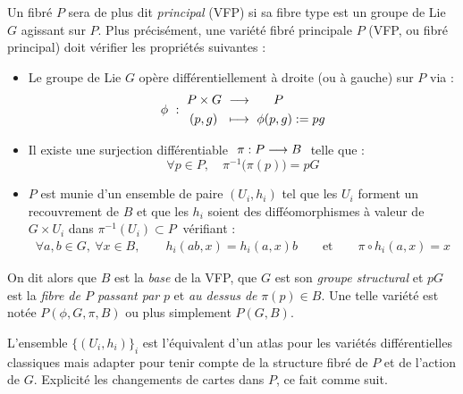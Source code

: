 \begin{definition} \label{def:VFP}
	Un fibré $P$ sera de plus dit \emph{principal} (VFP) si sa fibre type est un groupe de Lie $G$ agissant sur $P$. Plus précisément, une variété fibré principale $P$ (VFP, ou fibré principal) doit vérifier les propriétés suivantes :
	\begin{itemize}
		\item Le groupe de Lie $G$ opère différentiellement à droite (ou à gauche) sur $P$ via :
		\begin{equation} \label{eq:VFP_action}
			\phi\ :\ \begin{aligned}P\times G\ &\longrightarrow\quad\ \ P \\ (p,g)\ \ &\longmapsto\ \phi(p,g):= pg
			\end{aligned}
		\end{equation}
		
		\item Il existe une surjection différentiable $\ \pi:P\longrightarrow B\ $ telle que :
		\begin{equation} \label{eq:VFP_fibres}
			\forall p\in P,\quad \pi^{-1}\big(\pi(p)\big)=pG
		\end{equation}
		
		\item $P$ est munie d'un ensemble de paire $(U_i, h_i)$ tel que les $U_i$ forment un recouvrement de $B$ et que les $h_i$ soient des difféomorphismes à valeur de  $G\times U_i$ dans $\pi^{-1}(U_i)\subset P\ $ vérifiant :
		\begin{align*} \label{eq:VFP_atlas}
			\forall a,b\in G,\ \forall x\in B,\qquad h_i(ab,x) = h_i(a,x)b\qquad \text{et} \qquad \pi\circ h_i(a,x)=x
		\end{align*}
	\end{itemize}
	On dit alors que $B$ est la \emph{base} de la VFP, que $G$ est son \emph{groupe structural} et $pG$ est la \emph{fibre de $P$ passant par} $p$ et \emph{au dessus de} $\pi(p)\in B$. Une telle variété est notée $P(\phi, G, \pi, B)$ ou plus simplement $P(G,B)$.
\end{definition}

L'ensemble $\big\{(U_i, h_i)\big\}_i$ est l'équivalent d'un atlas pour les variétés différentielles classiques mais adapter pour tenir compte de la structure fibré de $P$ et de l'action de $G$. Explicité les changements de cartes dans $P$, ce fait comme suit.


